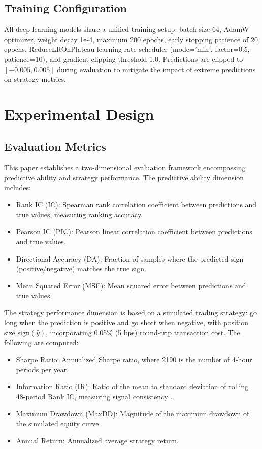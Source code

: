 \documentclass[a4paper]{cas-dc}
\begin{document}
\subsection{Training Configuration}

All deep learning models share a unified training setup: batch size 64, AdamW optimizer, weight decay 1e-4, maximum 200 epochs, early stopping patience of 20 epochs, ReduceLROnPlateau learning rate scheduler (mode='min', factor=0.5, patience=10), and gradient clipping threshold 1.0. Predictions are clipped to $[-0.005, 0.005]$ during evaluation to mitigate the impact of extreme predictions on strategy metrics.

\section{Experimental Design}

\subsection{Evaluation Metrics}

This paper establishes a two-dimensional evaluation framework encompassing predictive ability and strategy performance. The predictive ability dimension includes:

\begin{itemize}[leftmargin=1.5em]
    \item Rank IC (IC): Spearman rank correlation coefficient between predictions and true values, measuring ranking accuracy.
    \item Pearson IC (PIC): Pearson linear correlation coefficient between predictions and true values.
    \item Directional Accuracy (DA): Fraction of samples where the predicted sign (positive/negative) matches the true sign.
    \item Mean Squared Error (MSE): Mean squared error between predictions and true values.
\end{itemize}

The strategy performance dimension is based on a simulated trading strategy: go long when the prediction is positive and go short when negative, with position size $\text{sign}(\hat{y})$, incorporating 0.05\% (5 bps) round-trip transaction cost. The following are computed:

\begin{itemize}[leftmargin=1.5em]
    \item Sharpe Ratio: Annualized Sharpe ratio, where 2190 is the number of 4-hour periods per year.
    \item Information Ratio (IR): Ratio of the mean to standard deviation of rolling 48-period Rank IC, measuring signal consistency \cite{grinold2000}.
    \item Maximum Drawdown (MaxDD): Magnitude of the maximum drawdown of the simulated equity curve.
    \item Annual Return: Annualized average strategy return.
\end{itemize}
\end{document}
